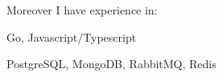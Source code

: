 Moreover I have experience in:
\begin{bulist}
\item Go, Javascript/Typescript
\item PostgreSQL, MongoDB, RabbitMQ, Redis
\end{bulist}

